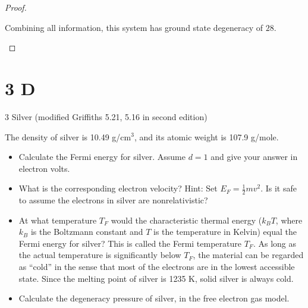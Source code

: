 \documentclass{article}
\begin{document}
\begin{proof}
\begin{enumerate}
        Combining all information, this system has ground state degeneracy of $28$.
    \end{enumerate}
\end{proof}

\newpage

\section*{3 D}
\begin{ques}
3 Silver (modified Griffiths 5.21, 5.16 in second edition)

The density of silver is 10.49 g/cm$^3$, and its atomic weight is 107.9 g/mole.

\begin{itemize}
    \item[(a)] Calculate the Fermi energy for silver. Assume $d = 1$ and give your answer in electron volts.

\item[(b)] What is the corresponding electron velocity? Hint: Set $E_F = \frac{1}{2}mv^2$. Is it safe to assume the electrons in silver are nonrelativistic?

\item[(c)] At what temperature $T_F$ would the characteristic thermal energy ($k_B T$, where $k_B$
is the Boltzmann constant and $T$ is the temperature in Kelvin) equal the Fermi
energy for silver? This is called the Fermi temperature $T_F$. As long as the actual
temperature is significantly below $T_F$, the material can be regarded as “cold” in the
sense that most of the electrons are in the lowest accessible state. Since the melting
point of silver is 1235 K, solid silver is always cold.

\item[(d)] Calculate the degeneracy pressure of silver, in the free electron gas model.
\end{itemize}

\end{ques}
\end{document}
